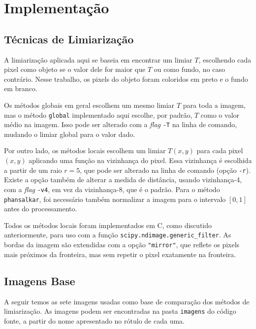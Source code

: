 \section{Implementação} \label{sec:impl}

\subsection{Técnicas de Limiarização}

    A limiarização aplicada aqui se baseia em encontrar um limiar $T$, escolhendo cada pixel como objeto se o valor dele for maior que $T$ ou como fundo, no caso contrário. Nesse trabalho, os pixels do objeto foram coloridos em preto e o fundo em branco.

    Os métodos globais em geral escolhem um mesmo limiar $T$ para toda a imagem, mas o método \texttt{global} implementado aqui escolhe, por padrão, $T$ como o valor médio na imagem. Isso pode ser alterado com a \textit{flag} \texttt{-T} na linha de comando, mudando o limiar global para o valor dado.

    Por outro lado, os métodos locais escolhem um limiar $T(x, y)$ para cada pixel $(x, y)$ aplicando uma função na vizinhança do pixel. Essa vizinhança é escolhida a partir de um raio $r = 5$, que pode ser alterado na linha de comando (opção \texttt{-r}). Existe a opção também de alterar a medida de distância, usando vizinhança-4, com a \textit{flag} \texttt{-v4}, em vez da vizinhança-8, que é o padrão. Para o método \texttt{phansalkar}, foi necessário também normalizar a imagem para o intervalo $[0, 1]$ antes do processamento.

    Todos os métodos locais foram implementados em C, como discutido anteriormente, para uso com a função \texttt{scipy.ndimage.generic_filter}. As bordas da imagem são extendidas com a opção \texttt{"mirror"}, que reflete os pixels mais próximos da fronteira, mas sem repetir o pixel exatamente na fronteira.

\begingroup
\subsection{Imagens Base} \label{sec:imgbase}


A seguir temos as sete imagens usadas como base de comparação dos métodos de limiarização. As imagens podem ser encontradas na pasta \texttt{imagens} do código fonte, a partir do nome apresentado no rótulo de cada uma.

